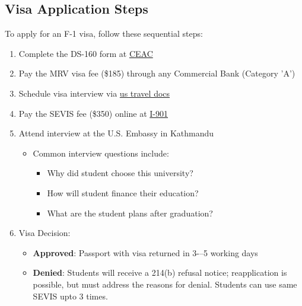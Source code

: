 \subsection{Visa Application Steps}
To apply for an F-1 visa, follow these sequential steps:

\begin{enumerate}
    \item Complete the DS-160 form at \href{https://ceac.state.gov}{CEAC}
    \item Pay the MRV visa fee (\$185) through any Commercial Bank (Category 'A')
    \item Schedule visa interview via \href{https://www.ustraveldocs.com/np}{us travel docs}
    \item Pay the SEVIS fee (\$350) online at \href{https://www.fmjfee.com/}{I-901}
    \item Attend interview at the U.S. Embassy in Kathmandu
    \begin{itemize}[label=--]
        \item Common interview questions include:
        \begin{itemize}
            \item Why did student choose this university?
            \item How will student finance their education?
            \item What are the student plans after graduation?
        \end{itemize}
    \end{itemize}
    \item Visa Decision:
    \begin{itemize}
        \item \textbf{Approved}: Passport with visa returned in 3-–5 working days
        \item \textbf{Denied}: Students will receive a 214(b) refusal notice; reapplication is possible, but must address the reasons for denial. Students can use same SEVIS upto 3 times.
    \end{itemize}
\end{enumerate}


